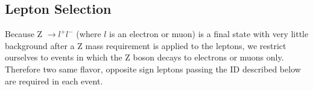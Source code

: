 \subsection{Lepton Selection}

Because Z $\rightarrow l^+l^-$ (where $l$ is an electron or muon) is a final state with very little background after a Z mass requirement is applied to the leptons,
 we restrict ourselves to events in which the Z boson decays to electrons or muons only.
 Therefore two same flavor, opposite sign leptons passing the ID described below are required in each event. 



